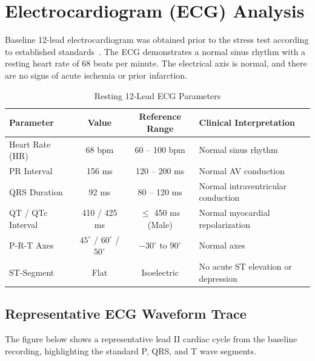 \section{Electrocardiogram (ECG) Analysis}

Baseline 12-lead electrocardiogram was obtained prior to the stress test according to established standards~\cite{kligfield2007standardization}. The ECG demonstrates a normal sinus rhythm with a resting heart rate of 68 beats per minute. The electrical axis is normal, and there are no signs of acute ischemia or prior infarction.

\vspace{0.2cm}
\begin{table}[H]
\centering
\caption{Resting 12-Lead ECG Parameters}
\label{tab:ecg_params}
\begin{tabularx}{\textwidth}{l c c X}
\toprule
\textbf{Parameter} & \textbf{Value} & \textbf{Reference Range} & \textbf{Clinical Interpretation} \\
\midrule
Heart Rate (HR) & 68 bpm & 60 -- 100 bpm & Normal sinus rhythm \\
PR Interval & 156 ms & 120 -- 200 ms & Normal AV conduction \\
QRS Duration & 92 ms & 80 -- 120 ms & Normal intraventricular conduction \\
QT / QTc Interval & 410 / 425 ms & $\le$ 450 ms (Male) & Normal myocardial repolarization \\
P-R-T Axes & $45^\circ$ / $60^\circ$ / $50^\circ$ & $-30^\circ$ to $90^\circ$ & Normal axes \\
ST-Segment & Flat & Isoelectric & No acute ST elevation or depression \\
\bottomrule
\end{tabularx}
\end{table}

\subsection{Representative ECG Waveform Trace}
The figure below shows a representative lead II cardiac cycle from the baseline recording, highlighting the standard P, QRS, and T wave segments.

